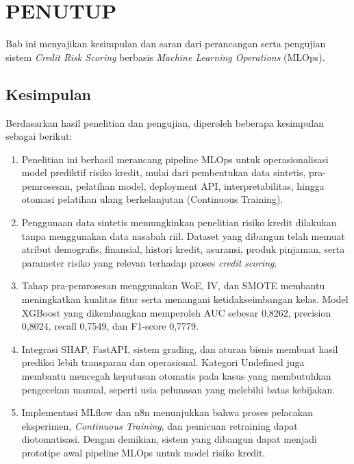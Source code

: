 \chapter{PENUTUP}
\label{sec:chap5_tutup}

Bab ini menyajikan kesimpulan dan saran dari perancangan serta pengujian sistem \textit{Credit Risk Scoring} berbasis \textit{Machine Learning Operations} (MLOps).

\section{Kesimpulan}
\label{sec:sec5_kesimpulan}
Berdasarkan hasil penelitian dan pengujian, diperoleh beberapa kesimpulan sebagai berikut:

\begin{enumerate}
    \item Penelitian ini berhasil merancang pipeline MLOps untuk operasionalisasi model prediktif risiko kredit, mulai dari pembentukan data sintetis, pra-pemrosesan, pelatihan model, deployment API, interpretabilitas, hingga otomasi pelatihan ulang berkelanjutan (Continuous Training).

    \item Penggunaan data sintetis memungkinkan penelitian risiko kredit dilakukan tanpa menggunakan data nasabah riil. Dataset yang dibangun telah memuat atribut demografis, finansial, histori kredit, asuransi, produk pinjaman, serta parameter risiko yang relevan terhadap proses \textit{credit scoring}.

    \item Tahap pra-pemrosesan menggunakan WoE, IV, dan SMOTE membantu meningkatkan kualitas fitur serta menangani ketidakseimbangan kelas. Model XGBoost yang dikembangkan memperoleh AUC sebesar 0,8262, precision 0,8024, recall 0,7549, dan F1-score 0,7779.

    \item Integrasi SHAP, FastAPI, sistem grading, dan aturan bisnis membuat hasil prediksi lebih transparan dan operasional. Kategori Undefined juga membantu mencegah keputusan otomatis pada kasus yang membutuhkan pengecekan manual, seperti usia pelunasan yang melebihi batas kebijakan.

    \item Implementasi MLflow dan n8n menunjukkan bahwa proses pelacakan eksperimen, \textit{Continuous Training}, dan pemicuan retraining dapat diotomatisasi. Dengan demikian, sistem yang dibangun dapat menjadi prototipe awal pipeline MLOps untuk model risiko kredit.
\end{enumerate}


